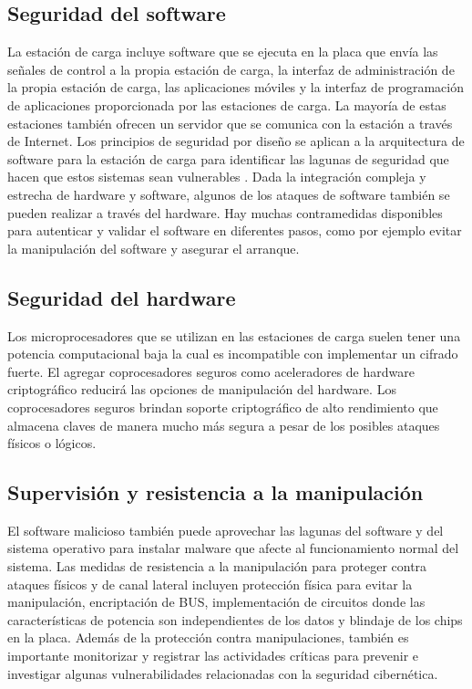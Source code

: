 \documentclass[12pt,a4paper,onecolumn,oneside]{report}
\begin{document}
\subsection{Seguridad del software}

La estación de carga incluye software que se ejecuta en la placa que envía las señales de control a la propia estación de carga, la interfaz de administración de la propia estación de carga, las aplicaciones móviles y la interfaz de programación de aplicaciones proporcionada por las estaciones de carga. La mayoría de estas estaciones también ofrecen un servidor que se comunica con la estación a través de Internet. Los principios de seguridad por diseño se aplican a la arquitectura de software para la estación de carga para identificar las lagunas de seguridad que hacen que estos sistemas sean vulnerables \cite{catorce}. Dada la integración compleja y estrecha de hardware y software, algunos de los ataques de software también se pueden realizar a través del hardware. Hay muchas contramedidas disponibles para autenticar y validar el software en diferentes pasos, como por ejemplo evitar la manipulación del software y asegurar el arranque.

\subsection{Seguridad del hardware}

Los microprocesadores que se utilizan en las estaciones de carga suelen tener una potencia computacional baja la cual es incompatible con implementar un cifrado fuerte. El agregar coprocesadores seguros como aceleradores de hardware criptográfico \cite{quince} reducirá las opciones de manipulación del hardware. Los coprocesadores seguros brindan soporte criptográfico de alto rendimiento que almacena claves de manera mucho más segura a pesar de los posibles ataques físicos o lógicos.


\subsection{Supervisión y resistencia a la manipulación}

El software malicioso también puede aprovechar las lagunas del software y del sistema operativo para instalar malware que afecte al funcionamiento normal del sistema. Las medidas de resistencia a la manipulación para proteger contra ataques físicos y de canal lateral incluyen protección física para evitar la manipulación, encriptación de BUS, implementación de circuitos donde las características de potencia son independientes de los datos y blindaje de los chips en la placa. Además de la protección contra manipulaciones, también es importante monitorizar y registrar las actividades críticas para prevenir e investigar algunas vulnerabilidades relacionadas con la seguridad cibernética.
\end{document}
